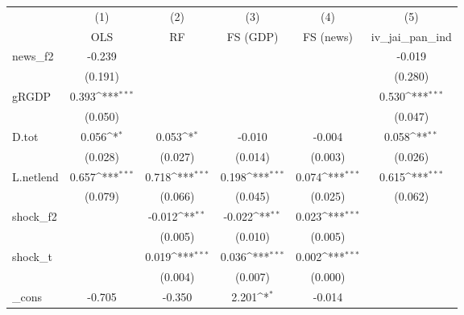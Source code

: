 {
\def\sym#1{\ifmmode^{#1}\else\(^{#1}\)\fi}
\begin{tabular}{l*{5}{c}}
\toprule
            &\multicolumn{1}{c}{(1)}&\multicolumn{1}{c}{(2)}&\multicolumn{1}{c}{(3)}&\multicolumn{1}{c}{(4)}&\multicolumn{1}{c}{(5)}\\
            &\multicolumn{1}{c}{OLS}&\multicolumn{1}{c}{RF}&\multicolumn{1}{c}{FS (GDP)}&\multicolumn{1}{c}{FS (news)}&\multicolumn{1}{c}{iv\_jai\_pan\_ind}\\
\midrule
news\_f2     &      -0.239         &                     &                     &                     &      -0.019         \\
            &     (0.191)         &                     &                     &                     &     (0.280)         \\
\addlinespace
gRGDP       &       0.393\sym{***}&                     &                     &                     &       0.530\sym{***}\\
            &     (0.050)         &                     &                     &                     &     (0.047)         \\
\addlinespace
D.tot       &       0.056\sym{*}  &       0.053\sym{*}  &      -0.010         &      -0.004         &       0.058\sym{**} \\
            &     (0.028)         &     (0.027)         &     (0.014)         &     (0.003)         &     (0.026)         \\
\addlinespace
L.netlend   &       0.657\sym{***}&       0.718\sym{***}&       0.198\sym{***}&       0.074\sym{***}&       0.615\sym{***}\\
            &     (0.079)         &     (0.066)         &     (0.045)         &     (0.025)         &     (0.062)         \\
\addlinespace
shock\_f2    &                     &      -0.012\sym{**} &      -0.022\sym{**} &       0.023\sym{***}&                     \\
            &                     &     (0.005)         &     (0.010)         &     (0.005)         &                     \\
\addlinespace
shock\_t     &                     &       0.019\sym{***}&       0.036\sym{***}&       0.002\sym{***}&                     \\
            &                     &     (0.004)         &     (0.007)         &     (0.000)         &                     \\
\addlinespace
\_cons      &      -0.705         &      -0.350         &       2.201\sym{*}  &      -0.014         &                     \\

\end{tabular}}
